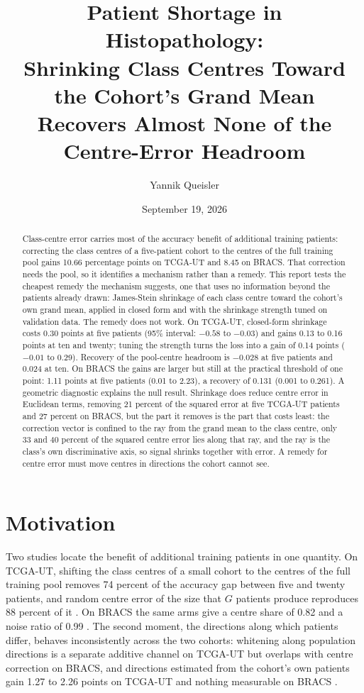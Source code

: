 \documentclass[11pt]{article}
\title{Patient Shortage in Histopathology:\\Shrinking Class Centres Toward the Cohort's Grand Mean\\Recovers Almost None of the Centre-Error Headroom}
\author{Yannik Queisler}
\date{September 19, 2026}
\begin{document}
\raggedbottom
{}
\setlength{\emergencystretch}{2em}
\maketitle
\begin{abstract}
\noindent Class-centre error carries most of the accuracy benefit of additional training patients: correcting the class centres of a five-patient cohort to the centres of the full training pool gains 10.66 percentage points on TCGA-UT and 8.45 on BRACS. That correction needs the pool, so it identifies a mechanism rather than a remedy. This report tests the cheapest remedy the mechanism suggests, one that uses no information beyond the patients already drawn: James-Stein shrinkage of each class centre toward the cohort's own grand mean, applied in closed form and with the shrinkage strength tuned on validation data. The remedy does not work. On TCGA-UT, closed-form shrinkage costs 0.30 points at five patients (95\% interval: $-0.58$ to $-0.03$) and gains 0.13 to 0.16 points at ten and twenty; tuning the strength turns the loss into a gain of 0.14 points ($-0.01$ to 0.29). Recovery of the pool-centre headroom is $-0.028$ at five patients and 0.024 at ten. On BRACS the gains are larger but still at the practical threshold of one point: 1.11 points at five patients (0.01 to 2.23), a recovery of 0.131 (0.001 to 0.261). A geometric diagnostic explains the null result. Shrinkage does reduce centre error in Euclidean terms, removing 21 percent of the squared error at five TCGA-UT patients and 27 percent on BRACS, but the part it removes is the part that costs least: the correction vector is confined to the ray from the grand mean to the class centre, only 33 and 40 percent of the squared centre error lies along that ray, and the ray is the class's own discriminative axis, so signal shrinks together with error. A remedy for centre error must move centres in directions the cohort cannot see.
\end{abstract}

\section{Motivation}
\label{sec:motivation}
Two studies locate the benefit of additional training patients in one quantity. On TCGA-UT, shifting the class centres of a small cohort to the centres of the full training pool removes 74 percent of the accuracy gap between five and twenty patients, and random centre error of the size that $G$ patients produce reproduces 88 percent of it \citep{queisler2026centreError}. On BRACS the same arms give a centre share of 0.82 and a noise ratio of 0.99 \citep{queisler2026bracsMechanism}. The second moment, the directions along which patients differ, behaves inconsistently across the two cohorts: whitening along population directions is a separate additive channel on TCGA-UT \citep{queisler2026patientDirections} but overlaps with centre correction on BRACS, and directions estimated from the cohort's own patients gain 1.27 to 2.26 points on TCGA-UT and nothing measurable on BRACS \citep{queisler2026bracsMechanism}.
\end{document}

